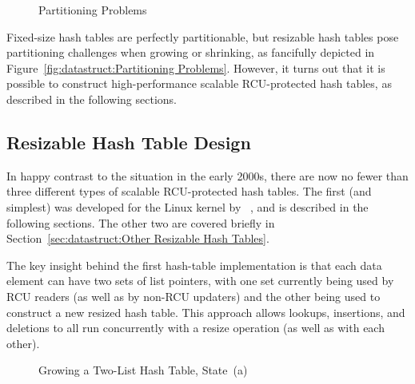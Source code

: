 \begin{figure}
\centering
{}
\caption{Partitioning Problems}
\end{figure}

Fixed-size hash tables are perfectly partitionable, but resizable hash
tables pose partitioning challenges when growing or shrinking, as
fancifully depicted in
Figure~\ref{fig:datastruct:Partitioning Problems}.
However, it turns out that it is possible to construct high-performance
scalable RCU-protected hash tables, as described in the following sections.

\subsection{Resizable Hash Table Design}
\label{sec:datastruct:Resizable Hash Table Design}

In happy contrast to the situation in the early 2000s, there are now
no fewer than three different types of scalable RCU-protected hash
tables.
The first (and simplest) was developed for the Linux kernel by
~\cite{HerbertXu2010RCUResizeHash}, and is described in the
following sections.
The other two are covered briefly in
Section~\ref{sec:datastruct:Other Resizable Hash Tables}.

The key insight behind the first hash-table implementation is that
each data element can have two sets of list pointers, with one set
currently being used by RCU readers (as well as by non-RCU updaters)
and the other being used to construct a new resized hash table.
This approach allows lookups, insertions, and deletions to all run
concurrently with a resize operation (as well as with each other).

\begin{figure}
\centering
{}
\caption{Growing a Two-List Hash Table, State~(a)}
\label{fig:datastruct:Growing a Two-List Hash Table; State (a)}
\end{figure}

